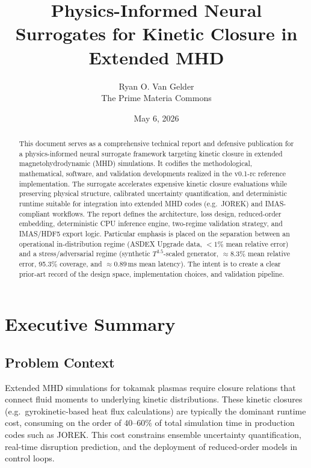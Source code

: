 \documentclass[11pt]{article}
\title{Physics-Informed Neural Surrogates for Kinetic Closure in Extended MHD}
\author{%
  Ryan O. Van Gelder \\ The Prime Materia Commons%
}
\date{May 6, 2026}
\begin{document}
\maketitle

\begin{abstract}
This document serves as a comprehensive technical report and defensive publication for a physics-informed neural surrogate framework targeting kinetic closure in extended magnetohydrodynamic (MHD) simulations. It codifies the methodological, mathematical, software, and validation developments realized in the v0.1-rc reference implementation. The surrogate accelerates expensive kinetic closure evaluations while preserving physical structure, calibrated uncertainty quantification, and deterministic runtime suitable for integration into extended MHD codes (e.g.\ JOREK) and IMAS-compliant workflows. The report defines the architecture, loss design, reduced-order embedding, deterministic CPU inference engine, two-regime validation strategy, and IMAS/HDF5 export logic. Particular emphasis is placed on the separation between an operational in-distribution regime (ASDEX Upgrade data, $<1\%$ mean relative error) and a stress/adversarial regime (synthetic $T^{3.5}$-scaled generator, $\approx 8.3\%$ mean relative error, 95.3\% coverage, and $\approx 0.89$\,ms mean latency). The intent is to create a clear prior-art record of the design space, implementation choices, and validation pipeline.
\end{abstract}
\newpage{}
\tableofcontents
\newpage{}
\section{Executive Summary}

\subsection{Problem Context}

Extended MHD simulations for tokamak plasmas require closure relations that connect fluid moments to underlying kinetic distributions. These kinetic closures (e.g.\ gyrokinetic-based heat flux calculations) are typically the dominant runtime cost, consuming on the order of $40$--$60\%$ of total simulation time in production codes such as JOREK. This cost constrains ensemble uncertainty quantification, real-time disruption prediction, and the deployment of reduced-order models in control loops.
\end{document}

